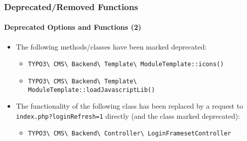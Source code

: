 
\begin{frame}[fragile]
	\frametitle{Deprecated/Removed Functions}
	\framesubtitle{Deprecated Options and Functions (2)}

	\begin{itemize}
		\item The following methods/classes have been marked deprecated:

			\begin{itemize}\smaller
				\item \texttt{TYPO3\textbackslash
					CMS\textbackslash
					Backend\textbackslash
					Template\textbackslash
					ModuleTemplate::icons()}

				\item \texttt{TYPO3\textbackslash
					CMS\textbackslash
					Backend\textbackslash
					Template\textbackslash
					ModuleTemplate::loadJavascriptLib()}

			\end{itemize}

		\item The functionality of the following class has been replaced by a
			request to \texttt{index.php?loginRefresh=1} directly (and the
			class marked deprecated):

			\begin{itemize}\smaller
				\item \texttt{TYPO3\textbackslash
					CMS\textbackslash
					Backend\textbackslash
					Controller\textbackslash
					LoginFramesetController}
			\end{itemize}\smaller

	\end{itemize}

\end{frame}


